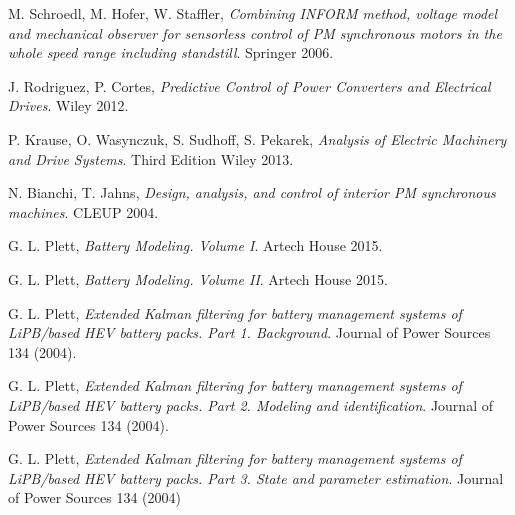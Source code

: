 \documentclass[11pt,a4paper,oneside]{book}
\numberwithin{equation}{section}
\theoremstyle{it}
\theoremstyle{definition}
\begin{document}
%	
%	
%	



\clearpage
\begin{thebibliography}{99}
	M. Schroedl, M. Hofer, W. Staffler, \emph{Combining INFORM method, voltage model and mechanical observer for sensorless control of PM synchronous motors in the whole speed range including standstill}. Springer 2006.
	
	J. Rodriguez, P. Cortes, \emph{Predictive Control of Power Converters and Electrical Drives}. Wiley 2012.
	
	P. Krause, O. Wasynczuk, S. Sudhoff, S. Pekarek, \emph{Analysis of Electric Machinery and Drive Systems}. Third Edition Wiley 2013.
	
	N. Bianchi, T. Jahns,  \emph{Design, analysis, and control of interior PM synchronous machines}. CLEUP 2004.
	
	G. L. Plett,  \emph{Battery Modeling. Volume I}. Artech House 2015.
	
	G. L. Plett,  \emph{Battery Modeling. Volume II}. Artech House 2015.
	
	G. L. Plett,  \emph{Extended Kalman filtering for battery management systems of LiPB/based HEV battery packs. Part 1. Background}. Journal of Power Sources 134 (2004).
	
	G. L. Plett,  \emph{Extended Kalman filtering for battery management systems of LiPB/based HEV battery packs. Part 2. Modeling and identification}. Journal of Power Sources 134 (2004).	
	
	G. L. Plett,  \emph{Extended Kalman filtering for battery management systems of LiPB/based HEV battery packs. Part 3. State and parameter estimation}. Journal of Power Sources 134 (2004)	
	
\end{thebibliography}
\end{document}
